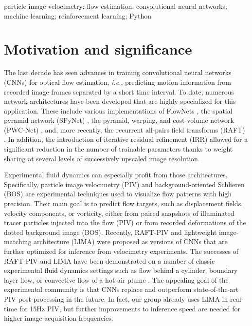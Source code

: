 \documentclass[a4paper,fleqn]{cas-dc}
\begin{document}
\begin{keywords}
particle image velocimetry; flow estimation; convolutional neural networks; machine learning; reinforcement learning; Python
\end{keywords}

\maketitle

\section{Motivation and significance\label{sec:introduction}}

The last decade has seen advances in training convolutional neural networks (CNNs) for optical flow estimation, \textit{i.e.}, predicting motion information from recorded image frames separated by a short time interval. To date, numerous network architectures have been developed that are highly specialized for this application. These include various implementations of FlowNets \citep{dosovitskiy2015flownet, ilg2017flownet, hui2018liteflownet}, the spatial pyramid network (SPyNet) \cite{ranjan2017optical}, the pyramid, warping, and cost-volume network (PWC-Net) \cite{sun2018pwc}, and, more recently, the recurrent all-pairs field transforms (RAFT) \cite{teed2020raft}. In addition, the introduction of iterative residual refinement (IRR) \cite{hur2019iterative} allowed for a significant reduction in the number of trainable parameters thanks to weight sharing at several levels of successively upscaled image resolution.

Experimental fluid dynamics can especially profit from those architectures. Specifically, particle image velocimetry (PIV) and background-oriented Schlieren (BOS) are experimental techniques used to visualize flow patterns with high precision. Their main goal is to predict flow targets, such as displacement fields, velocity components, or vorticity, either from paired snapshots of illuminated tracer particles injected into the flow (PIV) or from recorded deformations of the dotted background image (BOS). Recently, RAFT-PIV \cite{lagemann2021deep} and lightweight image-matching architecture (LIMA) \citep{manickathan2023lightweight} were proposed as versions of CNNs that are further optimized for inference from velocimetry experiments. The successes of RAFT-PIV and LIMA have been demonstrated on a number of classic experimental fluid dynamics settings such as flow behind a cylinder, boundary layer flow, or convective flow of a hot air plume \cite{mucignat2023lightweight}. The appealing goal of the experimental community is that CNNs replace and outperform state-of-the-art PIV post-processing in the future. In fact, our group already uses LIMA in real-time for 15Hz PIV, but further improvements to inference speed are needed for higher image acquisition frequencies.
\end{document}
